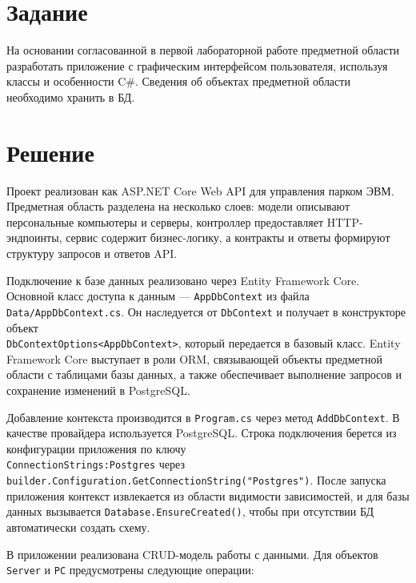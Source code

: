 \documentclass[oneside,14pt,a4paper]{extarticle}
\begin{document}
  \section{Задание}
  На основании согласованной в первой лабораторной работе предметной области разработать приложение с  графическим интерфейсом пользователя, используя классы и особенности C\#. Сведения  об объектах предметной области необходимо хранить в БД.

  \section{Решение}
  Проект реализован как ASP.NET Core Web API для управления парком ЭВМ. Предметная область разделена на несколько слоев: модели описывают персональные компьютеры и серверы, контроллер предоставляет HTTP-эндпоинты, сервис содержит бизнес-логику, а контракты и ответы формируют структуру запросов и ответов API.

  Подключение к базе данных реализовано через Entity Framework Core. Основной класс доступа к данным --- \texttt{AppDbContext} из файла \texttt{Data/AppDbContext.cs}. Он наследуется от \texttt{DbContext} и получает в конструкторе объект \\
  \texttt{DbContextOptions<AppDbContext>}, который передается в базовый класс. Entity Framework Core выступает в роли ORM, связывающей объекты предметной области с таблицами базы данных, а также обеспечивает выполнение запросов и сохранение изменений в PostgreSQL.

  Добавление контекста производится в \texttt{Program.cs} через метод \texttt{AddDbContext}. В качестве провайдера используется PostgreSQL. Строка подключения берется из конфигурации приложения по ключу \\
  \texttt{ConnectionStrings:Postgres} через \\
  \texttt{builder.Configuration.GetConnectionString("Postgres")}. После запуска приложения контекст извлекается из области видимости зависимостей, и для базы данных вызывается \texttt{Database.EnsureCreated()}, чтобы при отсутствии БД автоматически создать схему.

  В приложении реализована CRUD-модель работы с данными. Для объектов \texttt{Server} и \texttt{PC} предусмотрены следующие операции:
\end{document}
